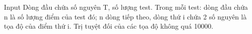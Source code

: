 Input
Dòng đầu chứa số nguyên T, số lượng test. Trong mỗi test: dòng đầu chứa n là số lượng điểm của test đó; n dòng tiếp theo, dòng thứ i chứa 2 số nguyên là tọa độ của điểm thứ i. Trị tuyệt đối của các tọa độ không quá 10000.